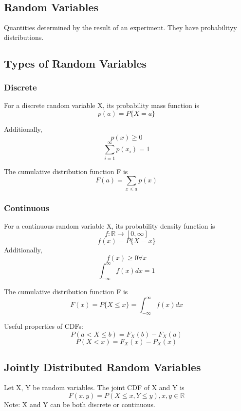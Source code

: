\subsection{Random Variables}
\begin{defi}
    Quantities determined by the result of an experiment. They have probabilityy distributions.
\end{defi}
\subsection{Types of Random Variables}
\subsubsection{Discrete}
\begin{defi}
    For a discrete random variable X, its probability mass function is
    \[p(a) = P\{X=a\}\]

    Additionally, 
    \[p(x) \geq 0\]
    \[\sum_{i=1}^{\infty} p(x_i) = 1\]
\end{defi}
\begin{defi}
    The cumulative distribution function F is
    \[F(a) = \sum_{x\leq a}p(x)\]
\end{defi}
\subsubsection{Continuous}
\begin{defi}
    For a continuous random variable X, its probability density function is
    \[f:\mathbb{R}\rightarrow[0,\infty]\]
    \[f(x) = P\{X=x\}\]
    Additionally,
    \[f(x) \geq 0 \forall x\]
    \[\int_{-\infty}^{\infty}f(x)dx = 1\]
\end{defi}
\begin{defi}
    The cumulative distribution function F is
    \[F(x) = P\{X\leq x\} 
    = \int_{-\infty}^{\infty}f(x)dx\]
\end{defi}

Useful properties of CDFs:
\[P(a<X\leq b) = F_X(b) - F_X(a)\]
\[P(X<x) = F_X(x) - P_X(x)\]

\subsection{Jointly Distributed Random Variables}
Let X, Y be random variables. The joint CDF of X and Y is 
\[ F(x, y) = P(X\leq x, Y\leq y), x,y\in\mathbb{R} \]
Note: X and Y can be both discrete or continuous.\\

